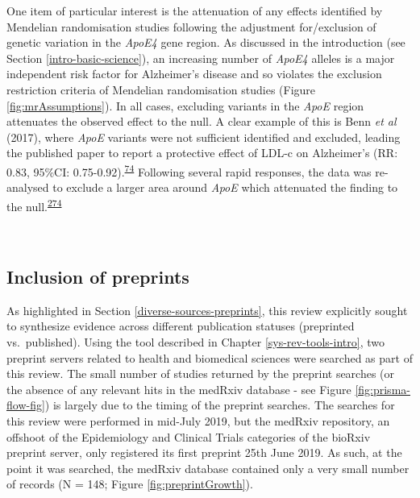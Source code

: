 \documentclass[a4paper, twoside]{templates/ociamthesis}
\begin{document}
One item of particular interest is the attenuation of any effects identified by Mendelian randomisation studies following the adjustment for/exclusion of genetic variation in the \emph{ApoE4} gene region. As discussed in the introduction (see Section \ref{intro-basic-science}), an increasing number of \emph{ApoE4} alleles is a major independent risk factor for Alzheimer's disease and so violates the exclusion restriction criteria of Mendelian randomisation studies (Figure \ref{fig:mrAssumptions}). In all cases, excluding variants in the \emph{ApoE} region attenuates the observed effect to the null. A clear example of this is Benn \emph{et al} (2017), where \emph{ApoE} variants were not sufficient identified and excluded, leading the published paper to report a protective effect of LDL-c on Alzheimer's (RR: 0.83, 95\%CI: 0.75-0.92).\textsuperscript{\protect\hyperlink{ref-benn2017}{74}} Following several rapid responses, the data was re-analysed to exclude a larger area around \emph{ApoE} which attenuated the finding to the null.\textsuperscript{\protect\hyperlink{ref-benn2017comment}{274}}

~

\hypertarget{inclusion-of-preprints}{%
\subsection{Inclusion of preprints}\label{inclusion-of-preprints}}

As highlighted in Section \ref{diverse-sources-preprints}, this review explicitly sought to synthesize evidence across different publication statuses (preprinted vs.~published). Using the tool described in Chapter \ref{sys-rev-tools-intro}, two preprint servers related to health and biomedical sciences were searched as part of this review. The small number of studies returned by the preprint searches (or the absence of any relevant hits in the medRxiv database - see Figure \ref{fig:prisma-flow-fig}) is largely due to the timing of the preprint searches. The searches for this review were performed in mid-July 2019, but the medRxiv repository, an offshoot of the Epidemiology and Clinical Trials categories of the bioRxiv preprint server, only registered its first preprint 25th June 2019. As such, at the point it was searched, the medRxiv database contained only a very small number of records (N = 148; Figure \ref{fig:preprintGrowth}).

~
\end{document}
